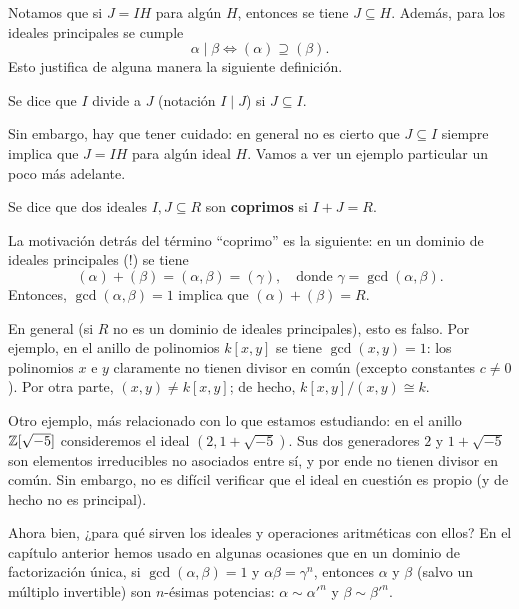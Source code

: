 Notamos que si $J = IH$ para algún $H$, entonces se tiene $J \subseteq H$.
Además, para los ideales principales se cumple
$$\alpha \mid \beta \iff (\alpha) \supseteq (\beta).$$
Esto justifica de alguna manera la siguiente definición.

\begin{definicion}
  Se dice que $I$ divide a $J$ (notación $I \mid J$) si $J \subseteq I$.
\end{definicion}

Sin embargo, hay que tener cuidado: en general no es cierto que $J \subseteq I$
siempre implica que $J = IH$ para algún ideal $H$. Vamos a ver un ejemplo
particular un poco más adelante.

\begin{definicion}
  Se dice que dos ideales $I,J \subseteq R$ son \textbf{coprimos} si
  $I + J = R$.
\end{definicion}

\begin{comentario}
  La motivación detrás del término ``coprimo'' es la siguiente:
  en un dominio de ideales principales (!) se tiene
  \[ (\alpha) + (\beta) = (\alpha,\beta) = (\gamma), \quad
     \text{donde }\gamma = \gcd (\alpha,\beta). \]
  Entonces, $\gcd (\alpha,\beta) = 1$ implica que $(\alpha)+(\beta) = R$.
 
  En general (si $R$ no es un dominio de ideales principales), esto es
  falso. Por ejemplo, en el anillo de polinomios $k[x,y]$ se tiene
  $\gcd (x,y) = 1$: los polinomios $x$ e $y$ claramente no tienen divisor en
  común (excepto constantes $c\ne 0$). Por otra parte, $(x,y) \ne k [x,y]$;
  de hecho, $k [x,y]/(x,y) \cong k$.

  Otro ejemplo, más relacionado con lo que estamos estudiando: en el anillo
  $\mathbb{Z} [\sqrt{-5}]$ consideremos el ideal $(2, 1 + \sqrt{-5})$. Sus dos
  generadores $2$ y $1 + \sqrt{-5}$ son elementos irreducibles no asociados
  entre sí, y por ende no tienen divisor en común. Sin embargo, no es difícil
  verificar que el ideal en cuestión es propio (y de hecho no es principal).
\end{comentario}

Ahora bien, ¿para qué sirven los ideales y operaciones aritméticas con ellos?
En el capítulo anterior hemos usado en algunas ocasiones que en un dominio
de factorización única, si $\gcd (\alpha,\beta) = 1$
y $\alpha\beta = \gamma^n$, entonces $\alpha$ y $\beta$ (salvo un múltiplo
invertible) son $n$-ésimas potencias: $\alpha \sim \alpha'^n$ y
$\beta \sim \beta'^n$.

